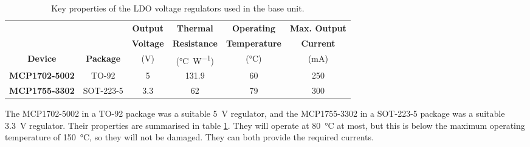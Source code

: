 \begin{table}[htb]
	\centering
	\caption{Key properties of the LDO voltage regulators used in the base unit.}
	\label{tab: ldo properties}
	\begin{adjustwidth}{-.5in}{-.5in}
	\begin{center}
	\begin{tabular}{|c|c|c|c|c|c|}
	\hline
	& & \textbf{Output} & \textbf{Thermal} & \textbf{Operating} & \textbf{Max. Output} \\
	& & \textbf{Voltage} & \textbf{Resistance} & \textbf{Temperature} & \textbf{Current}\\
	\textbf{Device} & \textbf{Package} &  (\si{\volt}) &  (\si{\celsius\per\watt}) &  (\si{\celsius}) &  (\si{\milli\ampere})\\
	\hline
	\textbf{MCP1702-5002} & TO-92 & 5 & 131.9 & 60 & 250 \\
	\hline
	\textbf{MCP1755-3302} & SOT-223-5 & 3.3 & 62 & 79 & 300 \\
	\hline
	\end{tabular}
	\end{center}
	\end{adjustwidth}
\end{table}

The MCP1702-5002 \cite{mcp1702} in a TO-92 package was a suitable \SI{5}{\volt} regulator, and the MCP1755-3302 in a SOT-223-5 package was a suitable \SI{3.3}{\volt} regulator. Their properties are summarised in table \ref{tab: ldo properties}. They will operate at \SI{80}{\celsius} at most, but this is below the maximum operating temperature of \SI{150}{\celsius}, so they will not be damaged. They can both provide the required currents.\\


